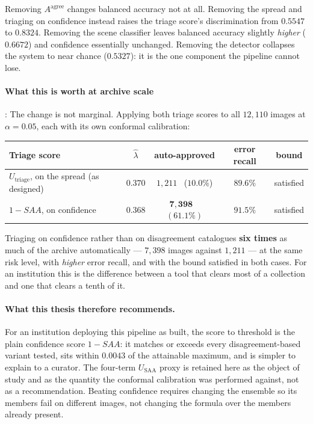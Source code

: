 \documentclass[12pt,a4paper]{report}
\begin{document}
Removing $A^{\text{agree}}$ changes balanced accuracy not at all. Removing the spread and
triaging on confidence instead raises the triage score's discrimination from $0.5547$ to
$0.8324$. Removing the scene classifier leaves balanced accuracy slightly \emph{higher}
($0.6672$) and confidence essentially unchanged. Removing the detector collapses the system to
near chance ($0.5327$): it is the one component the pipeline cannot lose.

\paragraph{What this is worth at archive scale}: The change is not marginal. Applying both triage
scores to all $12{,}110$ images at $\alpha=0.05$, each with its own conformal calibration:

\begin{center}
\small
\begin{tabular}{@{}l c c c c@{}}
\toprule
\textbf{Triage score} & $\hat\lambda$ & \textbf{auto-approved} & \textbf{error recall} & \textbf{bound} \\
\midrule
$U_{\text{triage}}$, on the spread (as designed) & $0.370$ & $1{,}211$ \ ($10.0\%$) & $89.6\%$ & satisfied \\
$1-SAA$, on confidence & $0.368$ & $\mathbf{7{,}398}$ \ $(\mathbf{61.1\%})$ & $\mathbf{91.5\%}$ & satisfied \\
\bottomrule
\end{tabular}
\end{center}

Triaging on confidence rather than on disagreement catalogues \textbf{six times} as much of the
archive automatically --- $7{,}398$ images against $1{,}211$ --- at the same risk level, with
\emph{higher} error recall, and with the bound satisfied in both cases. For an institution this is
the difference between a tool that clears most of a collection and one that clears a tenth of it.

\paragraph{What this thesis therefore recommends.} For an institution deploying this pipeline as
built, the score to threshold is the plain confidence score $1-SAA$: it matches or exceeds every
disagreement-based variant tested, sits within $0.0043$ of the attainable maximum, and is simpler
to explain to a curator. The four-term $U_{\text{SAA}}$ proxy is retained here as the object of
study and as the quantity the conformal calibration was performed against, not as a
recommendation. Beating confidence requires changing the ensemble so its members fail on
different images, not changing the formula over the members already present.
\end{document}
